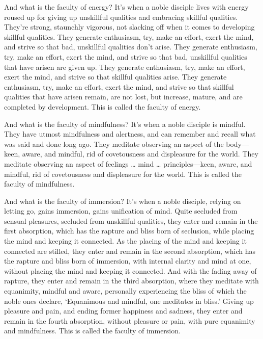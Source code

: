 \documentclass[12pt,openany]{book}%
\begin{document}
And what is the faculty of energy? It’s when a noble disciple lives with energy roused up for giving up unskillful qualities and embracing skillful qualities. They’re strong, staunchly vigorous, not slacking off when it comes to developing skillful qualities. They generate enthusiasm, try, make an effort, exert the mind, and strive so that bad, unskillful qualities don’t arise. They generate enthusiasm, try, make an effort, exert the mind, and strive so that bad, unskillful qualities that have arisen are given up. They generate enthusiasm, try, make an effort, exert the mind, and strive so that skillful qualities arise. They generate enthusiasm, try, make an effort, exert the mind, and strive so that skillful qualities that have arisen remain, are not lost, but increase, mature, and are completed by development. This is called the faculty of energy. 

And what is the faculty of mindfulness? It’s when a noble disciple is mindful. They have utmost mindfulness and alertness, and can remember and recall what was said and done long ago. They meditate observing an aspect of the body—keen, aware, and mindful, rid of covetousness and displeasure for the world. They meditate observing an aspect of feelings … mind … principles—keen, aware, and mindful, rid of covetousness and displeasure for the world. This is called the faculty of mindfulness. 

And what is the faculty of immersion? It’s when a noble disciple, relying on letting go, gains immersion, gains unification of mind. Quite secluded from sensual pleasures, secluded from unskillful qualities, they enter and remain in the first absorption, which has the rapture and bliss born of seclusion, while placing the mind and keeping it connected. As the placing of the mind and keeping it connected are stilled, they enter and remain in the second absorption, which has the rapture and bliss born of immersion, with internal clarity and mind at one, without placing the mind and keeping it connected. And with the fading away of rapture, they enter and remain in the third absorption, where they meditate with equanimity, mindful and aware, personally experiencing the bliss of which the noble ones declare, ‘Equanimous and mindful, one meditates in bliss.’ Giving up pleasure and pain, and ending former happiness and sadness, they enter and remain in the fourth absorption, without pleasure or pain, with pure equanimity and mindfulness. This is called the faculty of immersion. 
\end{document}
